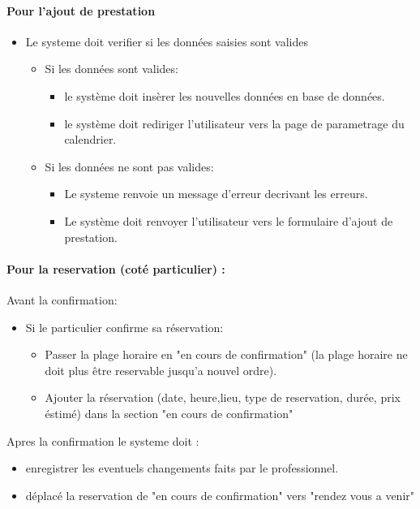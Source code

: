 \documentclass{article}
\begin{document}
\begin{itemize}
\begin{itemize}
\begin{itemize}
\paragraph{Pour l'ajout de prestation}
\begin{itemize}
\item Le systeme doit verifier si les données saisies sont valides
	\begin{itemize}
	\item Si les données sont valides:
		\begin{itemize}
		\item le système doit insèrer les nouvelles données en base
                  de données.
                  \item le système doit rediriger l'utilisateur vers
                    la page de parametrage du calendrier.
		\end{itemize}
		\item Si les données ne sont pas valides:
		\begin{itemize}
		\item Le systeme renvoie un message d'erreur decrivant
                  les erreurs.
                \item Le système doit renvoyer l'utilisateur vers le
                  formulaire d'ajout de prestation.
		\end{itemize}
	\end{itemize}
\end{itemize}


\paragraph{Pour la reservation (coté particulier) :}
Avant la confirmation:
	\begin{itemize}
	\item Si le particulier confirme sa réservation:
		\begin{itemize}
		\item Passer la plage horaire en "en cours de confirmation"
			(la plage horaire ne doit plus être reservable jusqu'a nouvel ordre).
		\item Ajouter la réservation (date, heure,lieu, type de reservation, durée, prix éstimé) dans la section "en cours de confirmation"
		\end{itemize}
	\end{itemize}
Apres la confirmation le systeme doit :
		\begin{itemize}
		\item enregistrer les eventuels changements faits par le professionnel.
		\item déplacé la reservation de "en cours de confirmation" vers "rendez vous a venir"
		\end{itemize}



\end{itemize}
\end{itemize}
\end{itemize}
\end{document}
